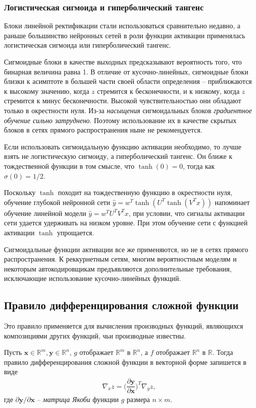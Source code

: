 \documentclass[%
	11pt,
	a4paper,
	utf8,
]{article}
\begin{document}
\subsubsection{Логистическая сигмоида и гиперболический тангенс}

Блоки линейной ректификации стали использоваться сравнительно недавно, а раньше большинство нейронных сетей в роли функции активации применялась логистическая сигмоида или гиперболический тангенс.

Сигмоидные блоки в качестве выходных предсказывают вероятность того, что бинарная величина равна 1. В отличие от кусочно-линейных, сигмоидные блоки близки к асимптоте в большей части своей области определения -- приближаются к высокому значению, когда $ z $ стремится к бесконечности, и к низкому, когда $ z $ стремится к минус бесконечности. Высокой чувствительностью они обладают только в окрестности нуля. Из-за \emph{насыщения} сигмоидальных блоков \emph{градиентное обучение сильно затруднено}. Поэтому использование их в качестве скрытых блоков в сетях прямого распространения ныне не рекомендуется. 

Если использовать сигмоидальную функцию активации необходимо, то лучше взять не логистическую сигмоиду, а гиперболический тангенс. Он ближе к тождественной функции в том смысле, что $ \tanh(0) = 0 $, тогда как $ \sigma(0) = 1/2 $.

Поскольку $ \tanh $ походит на тождественную функцию в окрестности нуля, обучение глубокой нейронной сети $ \hat{y} = w^T \tanh (U^T \tanh (V^T x)) $ напоминает обучение линейной модели $ \hat{y} = w^T U^T V^T x $, при условии, что сигналы активации сети удается удерживать на низком уровне. При этом обучение сети с функцией активации $ \tanh $ упрощается.

Сигмоидальные функции активации все же применяются, но не в сетях прямого распространения. К реккурнетным сетям, многим вероятностным моделям и некоторым автокодировщикам предъявляются дополнительные требования, исключающие использование кусочно-линейных функций.

\subsection{Правило дифференцирования сложной функции}

Это правило применяется для вычисления производных функций, являющихся композициями других функций, чьи производные известны. 

Пусть $ \mathbf{x} \in \mathbb{R}^m, \mathbf{y} \in \mathbb{R}^n $, $ g $ отображает $ \mathbb{R}^m $ в $ \mathbb{R}^n $, а $ f $ отображает $ \mathbb{R}^n $ в $ \mathbb{R} $. Тогда правило дифференцирования сложной функции в векторной форме запишется в виде
\begin{align*}
	\nabla_x z = \Big( \dfrac{ \partial \mathbf{y} }{ \partial \mathbf{x} } \Big)^T \nabla_y z,
\end{align*}
где $ \partial \mathbf{y} / \partial \mathbf{x} $ -- \emph{матрица Якоби} функции $ g $ размера $ n \times m $.
\end{document}
